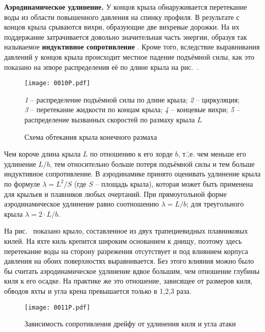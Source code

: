 \textbf{Аэродинамическое удлинение.}
У концов крыла обнаруживается
перетекание воды из области повышенного давления на спинку профиля. В
результате с концов крыла срываются вихри, образующие две вихревые
дорожки. На их поддержание затрачивается довольно значительная часть
энергии, образуя так называемое \textbf{индуктивное сопротивление}
. Кроме того,
вследствие выравнивания давлений у концов крыла происходит местное
падение подъёмной силы, как это показано на эпюре распределения её по
длине крыла на рис.~.

\begin{figure*}[htb]
  \centering
  \texttt{[image: 0010P.pdf]}
  \caption{Схема обтекания крыла конечного размаха}
  \label{fig:10}
  \centering
  \small
  \textit{1} \--- распределение подъёмной силы по длине крыла;
  \textit{2} \--- циркуляция;
  \textit{3} \--- перетекание жидкости по концам крыла;
  \textit{4} \--- концевые вихри;
  \textit{5} \--- распределение вызванных скоростей по размаху крыла $L$
\end{figure*}

Чем короче длина крыла $L$ по отношению к его хорде $b$, т.\=,е. чем
меньше его удлинение $L/b$, тем относительно больше потеря подъёмной
силы и тем больше индуктивное сопротивление. В аэродинамике принято
оценивать удлинение крыла по формуле $\lambda = L^2/S$ (где $S$ \---
площадь крыла), которая может быть применена для крыльев и плавников
любых очертаний. При прямоугольной форме аэродинамическое удлинение
равно соотношению $\lambda = L / b$; для треугольного крыла
$\lambda = 2 \cdot L / b$.

На рис.~ показано крыло, составленное из двух трапециевидных
плавниковых килей. На яхте киль крепится широким основанием к днищу,
поэтому здесь перетекание воды на сторону разрежения отсутствует и под
влиянием корпуса давления на обоих поверхностях выравнивается. Без
этого влияния можно было бы считать аэродинамическое удлинение вдвое
большим, чем отношение глубины киля к его осадке. На практике же это
отношение, зависящее от размеров киля, обводов яхты и угла крена
превышается только в 1,2,3 раза.

\begin{figure}[htb]
  \centering
  \texttt{[image: 0011P.pdf]}
  \caption{Зависимость сопротивления дрейфу от удлинения киля и угла атаки}
  \label{fig:11}
\end{figure}

